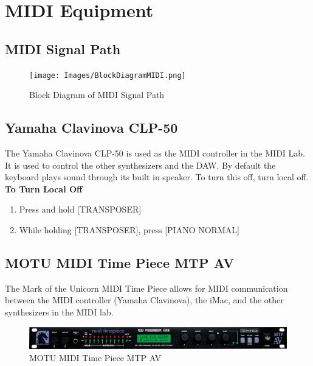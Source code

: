 \newpage
\section{MIDI Equipment}
\subsection{MIDI Signal Path}

\begin{figure}[h]
\centering
\texttt{[image: Images/BlockDiagramMIDI.png]}
\caption{Block Diagram of MIDI Signal Path}
\label{fig:fullfig}
\end{figure}

\subsection{Yamaha Clavinova CLP-50}

The Yamaha Clavinova CLP-50 is used as the MIDI controller in the MIDI Lab. It is used to control the other synthesizers and the DAW. By default the keyboard plays sound through its built in speaker. To turn this off, turn local off. \\

\textbf{To Turn Local Off} 

\begin{enumerate}
	\item Press and hold [TRANSPOSER]
	\item While holding [TRANSPOSER], press [PIANO NORMAL]	
\end{enumerate}

\newpage

\subsection{MOTU MIDI Time Piece MTP AV}
The Mark of the Unicorn MIDI Time Piece allows for MIDI communication between the MIDI controller (Yamaha Clavinova), the iMac, and the other synthesizers in the MIDI lab. \\

\begin{figure}[h]
\centering
\includegraphics[width=.85\textwidth]{Images/MOTU.jpg}
\caption{MOTU MIDI Time Piece MTP AV}
\label{fig:fullfig}
\end{figure}

